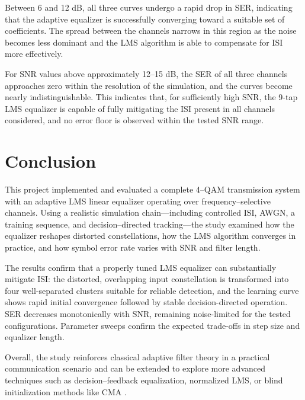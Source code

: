 \documentclass[12pt]{article}
\begin{document}
Between 6 and 12 dB, all three curves undergo a rapid drop in SER, indicating
that the adaptive equalizer is successfully converging toward a suitable set of
coefficients. The spread between the channels narrows in this region as the
noise becomes less dominant and the LMS algorithm is able to compensate for ISI
more effectively.

For SNR values above approximately 12--15 dB, the SER of all three channels
approaches zero within the resolution of the simulation, and the curves become
nearly indistinguishable. This indicates that, for sufficiently high SNR, the
9-tap LMS equalizer is capable of fully mitigating the ISI present in all
channels considered, and no error floor is observed within the tested SNR
range.





\section{Conclusion}\label{sec:conclusion}
This project implemented and evaluated a complete 4--QAM transmission system with an adaptive LMS linear equalizer operating over frequency–selective channels. Using a realistic simulation chain—including controlled ISI, AWGN, a training sequence, and decision–directed tracking—the study examined how the equalizer reshapes distorted constellations, how the LMS algorithm converges in practice, and how symbol error rate varies with SNR and filter length.


The results confirm that a properly tuned LMS equalizer can substantially mitigate ISI: the distorted, overlapping input constellation is transformed into four well-separated clusters suitable for reliable detection, and the learning curve shows rapid initial convergence followed by stable decision-directed operation. SER decreases monotonically with SNR, remaining noise-limited for the tested configurations. Parameter sweeps confirm the expected trade-offs in step size and equalizer length.



Overall, the study reinforces classical adaptive filter theory in a practical communication scenario and can be extended to explore more advanced techniques such as decision–feedback equalization, normalized LMS, or blind initialization methods like CMA \cite{haykin,godard,treichler}.
\end{document}
